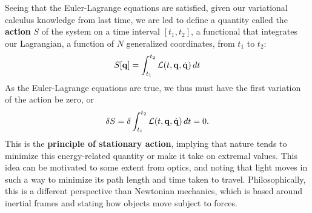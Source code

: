 Seeing that the Euler-Lagrange equations are satisfied, given our variational calculus knowledge from last time, we are led to define a quantity called the \textbf{action} $S$ of the system on a time interval $[t_1, t_2]$, a functional that integrates our Lagrangian, a function of $N$ generalized coordinates, from $t_1$ to $t_2$: 
\[
	S[\mathbf q] = \int_{t_1}^{t_2} \mathcal{L}(t, \mathbf q, \dot{\mathbf q}) \, dt
\]
As the Euler-Lagrange equations are true, we thus must have the first variation of the action be zero, or 
\[
	\delta S = \delta \int_{t_1}^{t_2} \mathcal{L}(t, \mathbf q, \dot{\mathbf q}) \, dt = 0.
\]
This is the \textbf{principle of stationary action}, implying that nature tends to minimize this energy-related quantity or make it take on extremal values. This idea can be motivated to some extent from optics, and noting that light moves in such a way to minimize its path length and time taken to travel. Philosophically, this is a different perspective than Newtonian mechanics, which is based around inertial frames and stating how objects move subject to forces. 

